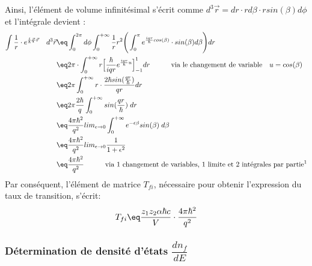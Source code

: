 Ainsi, l'élément de volume infinitésimal s'écrit comme  $d^3\vec{r} = dr \cdot r d\beta \cdot r sin(\beta) d\phi $ et l'intégrale devient :
\begin{align*}
    \int \dfrac{1}{r} \cdot e^{\frac{i}{\hbar}\vec{q}\cdot\vec{r}}
    \quad d^3\vec{r}
        &\eq
    \int_{0}^{2 \pi} d\phi
    \int_{0}^{+\infty} \dfrac{1}{r}r^2 
    \Bigg( 
        \int_{0}^{\pi}
        e^{\frac{iqr}{\hbar}cos(\beta)} \cdot sin(\beta) d\beta
    \Bigg) dr\\
        &\eq
    2 \pi \cdot \int_{0}^{+\infty} r 
    \Big[
      \frac{\hbar}{iqr}e^{\frac{iqr}{\hbar}u}
    \Big]^{1}_{-1}
    dr 
    \qquad \quad \text{via le changement de variable} \quad u = cos(\beta)\\
        &\eq
    2 \pi \int_{0}^{+\infty} r
    \cdot \frac{2\hbar sin(\frac{qr}{\hbar})}{qr} dr\\
        &\eq
    2 \pi \dfrac{2\hbar}{q} \int_{0}^{+\infty} sin(\frac{qr}{\hbar}) \; dr\\
        &\eq
    \dfrac{4\pi\hbar^2}{q^2} lim_{\epsilon \rightarrow 0}\int_{0}^{+\infty}e^{-\epsilon \beta} sin(\beta) \; d\beta\\
        &\eq
    \dfrac{4\pi\hbar^2}{q^2} lim_{\epsilon \rightarrow 0}\frac{1}{1 + \epsilon^2}\\
        &\eq
    \dfrac{4\pi\hbar^2}{q^2}
    \qquad \quad \text{via 1 changement de variables, 1 limite et 2 intégrales par partie\footnotemark} 
\end{align*}
Par conséquent, l'élément de matrice $T_{fi}$, nécessaire pour obtenir l'expression du taux de transition, s'écrit:
\begin{equation*}
    T_{fi} 
    \eq 
    \dfrac{z_1 z_2\alpha\hbar c}{V} \cdot \dfrac{4 \pi \hbar^2}{q^2}
\end{equation*}



\subsubsection{Détermination de densité d'états $\dfrac{dn_f}{dE}$}


